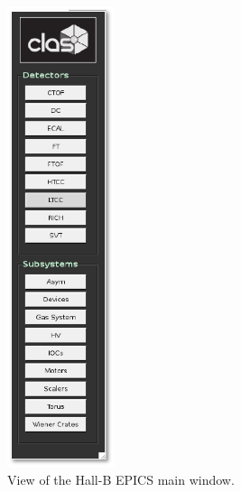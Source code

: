 \documentclass[12pt]{article}
\begin{document}
\begin{figure}[h!]
\center
\includegraphics[width=0.28\textwidth]{pics/CLAS_EPICS.pdf}
\caption{ \label{fig:RICH_EPICSmain} View of the Hall-B EPICS main window.}
\end{figure}
\end{document}
